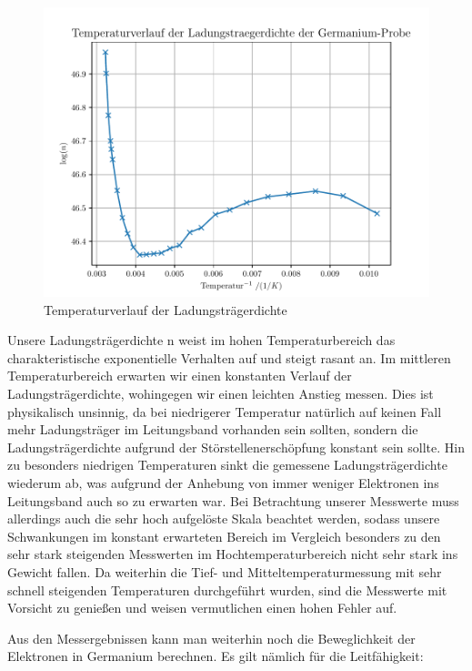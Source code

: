 \begin{figure}[htbp] 
     \includegraphics[scale=0.7]{temp_n.pdf}
  \caption{Temperaturverlauf der Ladungsträgerdichte}
  \label{n}
\end{figure}


Unsere Ladungsträgerdichte n weist im hohen Temperaturbereich das charakteristische exponentielle Verhalten auf und steigt rasant an. Im mittleren Temperaturbereich erwarten wir einen konstanten Verlauf der Ladungsträgerdichte, wohingegen wir einen leichten Anstieg messen. Dies ist physikalisch unsinnig, da bei niedrigerer Temperatur natürlich auf keinen Fall mehr Ladungsträger im Leitungsband vorhanden sein sollten, sondern die Ladungsträgerdichte aufgrund der Störstellenerschöpfung konstant sein sollte. Hin zu besonders niedrigen Temperaturen sinkt die gemessene Ladungsträgerdichte wiederum ab, was aufgrund der Anhebung von immer weniger Elektronen ins Leitungsband auch so zu erwarten war. 
Bei Betrachtung unserer Messwerte muss allerdings auch die sehr hoch aufgelöste Skala beachtet werden, sodass unsere Schwankungen im konstant erwarteten Bereich im Vergleich besonders zu den sehr stark steigenden Messwerten im Hochtemperaturbereich nicht sehr stark ins Gewicht fallen. Da weiterhin die Tief- und Mitteltemperaturmessung mit sehr schnell steigenden Temperaturen durchgeführt wurden, sind die Messwerte mit Vorsicht zu genießen und weisen vermutlichen einen hohen Fehler auf.


Aus den Messergebnissen kann man weiterhin noch die Beweglichkeit der Elektronen in Germanium berechnen. Es gilt nämlich für die Leitfähigkeit:

